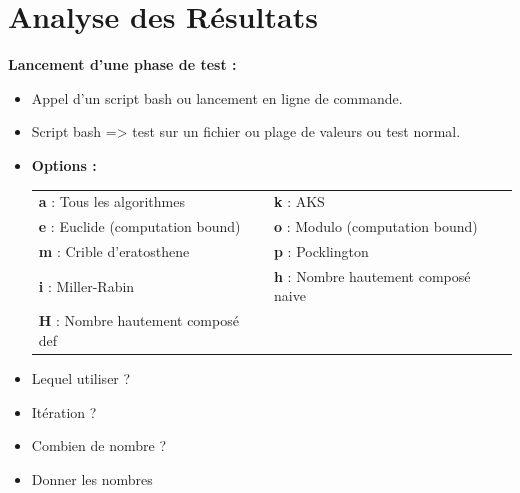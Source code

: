 	\section{Analyse des Résultats}
		\begin{frame}
		\textbf{Lancement d'une phase de test :}

	\begin{itemize}
		\item Appel d'un script bash ou lancement en ligne de commande.\\
		\item Script bash => test sur un fichier ou plage de valeurs ou test normal.
		\item \textbf{Options :}

	\begin{center}\footnotesize\begin{longtable}{l l}		
	\textbf{a} : Tous les algorithmes  & \textbf{k} : AKS\\
	\textbf{e} : Euclide (computation bound) & \textbf{o} : Modulo (computation bound)\\
	\textbf{m} : Crible d'eratosthene & \textbf{p} : Pocklington\\
	\textbf{i} : Miller-Rabin & \textbf{h} : Nombre hautement composé naive\\
	\textbf{H} : Nombre hautement composé def\\
	\end{longtable}\vspace{-2.2em}\end{center}

		\item Lequel utiliser ?\\
		\item Itération ?\\
		\item Combien de nombre ?\\
		\item Donner les nombres\\
	\end{itemize}
\end{frame}

